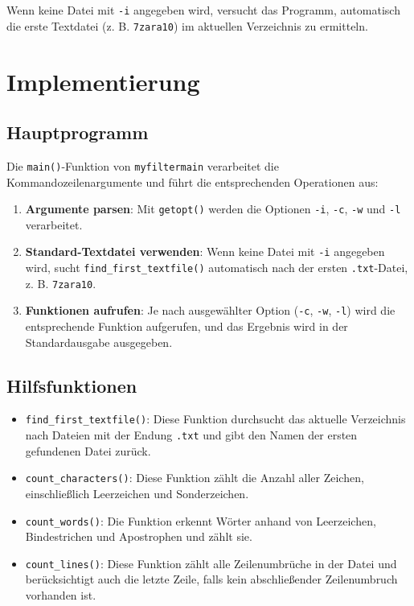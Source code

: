 \documentclass[10pt]{article} %
\begin{document}
Wenn keine Datei mit \texttt{-i} angegeben wird, versucht das Programm, automatisch die erste Textdatei (z. B. \texttt{7zara10}) im aktuellen Verzeichnis zu ermitteln.

\section{Implementierung}
\subsection{Hauptprogramm}
Die \texttt{main()}-Funktion von \texttt{myfiltermain} verarbeitet die Kommandozeilenargumente und führt die entsprechenden Operationen aus:
\begin{enumerate}
    \item \textbf{Argumente parsen}: Mit \texttt{getopt()} werden die Optionen \texttt{-i}, \texttt{-c}, \texttt{-w} und \texttt{-l} verarbeitet.
    \item \textbf{Standard-Textdatei verwenden}: Wenn keine Datei mit \texttt{-i} angegeben wird, sucht \texttt{find\_first\_textfile()} automatisch nach der ersten \texttt{.txt}-Datei, z. B. \texttt{7zara10}.
    \item \textbf{Funktionen aufrufen}: Je nach ausgewählter Option (\texttt{-c}, \texttt{-w}, \texttt{-l}) wird die entsprechende Funktion aufgerufen, und das Ergebnis wird in der Standardausgabe ausgegeben.
\end{enumerate}

\subsection{Hilfsfunktionen}
\begin{itemize}
    \item \texttt{find\_first\_textfile()}: Diese Funktion durchsucht das aktuelle Verzeichnis nach Dateien mit der Endung \texttt{.txt} und gibt den Namen der ersten gefundenen Datei zurück.
    \item \texttt{count\_characters()}: Diese Funktion zählt die Anzahl aller Zeichen, einschließlich Leerzeichen und Sonderzeichen.
    \item \texttt{count\_words()}: Die Funktion erkennt Wörter anhand von Leerzeichen, Bindestrichen und Apostrophen und zählt sie.
    \item \texttt{count\_lines()}: Diese Funktion zählt alle Zeilenumbrüche in der Datei und berücksichtigt auch die letzte Zeile, falls kein abschließender Zeilenumbruch vorhanden ist.
\end{itemize}
\end{document}

